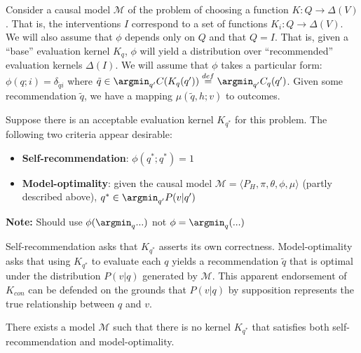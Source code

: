 Consider a causal model $\mathscr{M}$ of the problem of choosing a function $K:Q\to \Delta(V)$. That is, the interventions $I$ correspond to a set of functions $K_i:Q\to \Delta(V)$. We will also assume that $\phi$ depends only on $Q$ and that $Q=I$. That is, given a ``base'' evaluation kernel $K_q$, $\phi$ will yield a distribution over ``recommended'' evaluation kernels $\Delta(I)$. We will assume that $\phi$ takes a particular form: $\phi(q;i) = \delta_{\tilde{q}i}$ where $\tilde{q} \in \argmin_{q'} C(K_q(q'))\overset{def}{=} \argmin_{q'} C_q(q')$. Given some recommendation $\tilde{q}$, we have a mapping $\mu(\tilde{q},h;v)$ to outcomes.

Suppose there is an acceptable evaluation kernel $K_{q^*}$ for this problem. The following two criteria appear desirable:

\begin{itemize}
    \item \textbf{Self-recommendation}: $\phi(q^*;q^*)=1$
    \item \textbf{Model-optimality}: given the causal model $\mathscr{M}=\langle P_H, \pi,\theta,\phi,\mu\rangle$ (partly described above), $q^*\in \argmin_{q'} P(v|q')$
\end{itemize}

\textbf{Note: }Should use $\phi(\argmin_q ...)$ not $\phi=\argmin_q(...)$

Self-recommendation asks that $K_{q^*}$ asserts its own correctness. Model-optimality asks that using $K_{q^*}$ to evaluate each $q$ yields a recommendation $\tilde{q}$ that is optimal under the distribution $P(v|q)$ generated by $\mathscr{M}$. This apparent endorsement of $K_{con}$ can be defended on the grounds that $P(v|q)$ by supposition represents the true relationship between $q$ and $v$.

\begin{theorem}
There exists a model $\mathcal{M}$ such that there is no kernel $K_{q^*}$ that satisfies both self-recommendation and model-optimality.
\end{theorem}

